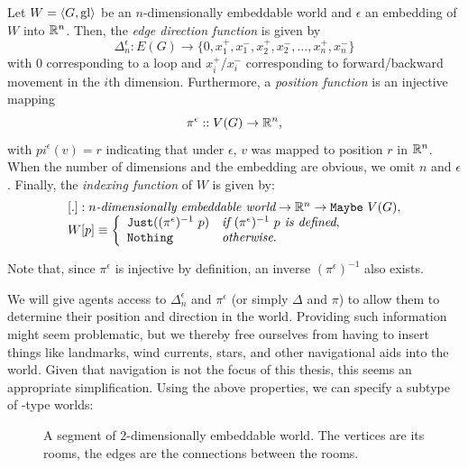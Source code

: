 \begin{definition}
Let $W = \langle G, \mathrm{gl} \rangle$ be an $n$-dimensionally embeddable world  and $\epsilon$ an embedding of $W$ into $\mathbb{R}^n$. Then, the {\em edge direction function} is given by
$$
   \Delta_n^\epsilon : E(G) \rightarrow \{0,x_1^+,x_1^-,x_2^+,x_2^-,\dots,x_n^+,x_n^-\}
$$
with $0$ corresponding to a loop and $x_i^+$/$x_i^-$ corresponding to forward/backward movement in the $i$th dimension. Furthermore, a {\em position function} is an injective mapping
$$
   \pi^\epsilon :: V(G) \rightarrow \mathbb{R}^n,
$$
with $pi^\epsilon(v) = r$ indicating that under $\epsilon$, $v$ was mapped to position $r$ in $\mathbb{R}^n$. When the number of dimensions and the embedding are obvious, we omit $n$ and $\epsilon$.
Finally, the {\em indexing function} of $W$ is given by:
$$
	\begin{array}{l}
		[.] : n\textit{-dimensionally embeddable world} \rightarrow \mathbb{R}^n \rightarrow \mathtt{Maybe}\ V(G),\\
		W[p] \equiv \left\{
			\begin{array}{l l}
				\mathtt{Just } ((\pi^\epsilon)^{-1}\ p) & \textit{if } (\pi^\epsilon)^{-1}\ p \textit{ is defined},\\
				\mathtt{Nothing} & \textit{otherwise}.
			\end{array}
			\right.
	\end{array}
$$
\end{definition}

Note that, since $\pi^\epsilon$ is injective by definition, an inverse $(\pi^\epsilon)^{-1}$ also exists.

We will give agents access to $\Delta_n^\epsilon$ and $\pi^\epsilon$ (or simply $\Delta$ and $\pi$) to allow them to determine their position and direction in the world. Providing such information might seem problematic, but we thereby free ourselves from having to insert things like landmarks, wind currents, stars, and other navigational aids into the world. Given that navigation is not the focus of this thesis, this seems an appropriate simplification. Using the above properties, we can specify a subtype of \wext-type worlds:

\begin{figure}
	\centering
	
	\caption{A segment of 2-dimensionally embeddable world. The vertices are its rooms, the edges are the connections between the rooms.}
	\label{fig:2dgrid}
\end{figure}

